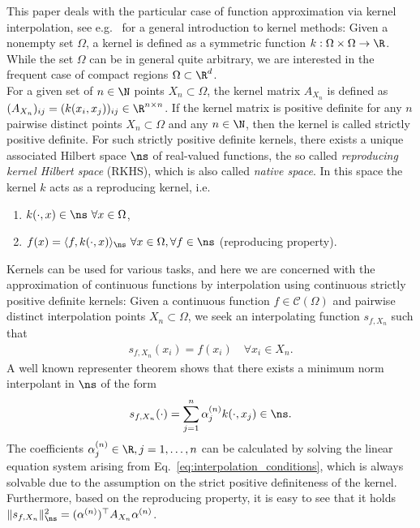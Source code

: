 \documentclass[a4paper, 10pt]{article}
\begin{document}
This paper deals with the particular case of function approximation via kernel interpolation, 
see e.g.~\cite{wendland2005scattered, fasshauer2007meshfree, fasshauer2015kernel, steinwart2008support} for a general introduction to kernel methods:
Given a nonempty set $\Omega$, a kernel is defined as a symmetric function $k: \Omega \times \Omega \rightarrow \R$.
While the set $\Omega$ can be in general quite arbitrary, we are interested in the frequent case of compact regions $\Omega \subset \R^d$. \\
For a given set of $n \in \N$ points $X_n \subset \Omega$, the kernel matrix $A_{X_n}$ is defined as $(A_{X_n})_{ij} = (k(x_i, x_j))_{ij} \in \R^{n \times n}$.
If the kernel matrix is positive definite for any $n$ pairwise distinct points $X_n \subset \Omega$ and any $n \in \N$, then the kernel is called strictly positive definite.
For such strictly positive definite kernels, there exists a unique associated Hilbert space $\ns$ of real-valued functions, the so called \textit{reproducing kernel Hilbert space} (RKHS), 
which is also called \textit{native space}.
In this space the kernel $k$ acts as a reproducing kernel, i.e.\ 
\begin{enumerate}
\item $k(\cdot, x) \in \ns ~ \forall x \in \Omega$,
\item $f(x) = \langle f, k(\cdot, x) \rangle_{\ns} ~ \forall x \in \Omega,  \forall f \in \ns$ \hfill (reproducing property).
\end{enumerate}
Kernels can be used for various tasks, and here we are concerned with the approximation of continuous functions by interpolation using continuous strictly positive definite kernels:
Given a continuous function $f \in \mathcal{C}(\Omega)$ and pairwise distinct interpolation points $X_n \subset \Omega$, we seek an interpolating function $s_{f, X_n}$ such that
\begin{align}
\label{eq:interpolation_conditions}
s_{f, X_n}(x_i) = f(x_i) \quad \forall x_i \in X_n.
\end{align}
A well known representer theorem shows
%
that there exists a minimum norm interpolant in $\ns$ of the form
\begin{align*}
s_{f, X_n}(\cdot) = \sum_{j=1}^n \alpha_j^{(n)} k(\cdot, x_j) \in \ns.
\end{align*}
The coefficients $\alpha_j^{(n)} \in \R, j= 1, \dots,n$ can be calculated by solving the linear equation system arising from Eq.~\eqref{eq:interpolation_conditions}, 
which is always solvable due to the assumption on the strict positive definiteness of the kernel.
Furthermore,
based on the reproducing property, it is easy to see that it holds $\Vert s_{f, X_n} \Vert_{\ns}^2 = (\alpha^{(n)})^\top A_{X_n} \alpha^{(n)}$.
\end{document}
